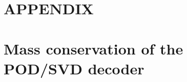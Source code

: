 \documentclass{article}
\begin{document}



\section*{APPENDIX}
\appendix
\renewcommand{\theequation}{A.\arabic{equation}}
\renewcommand{\thefigure}{A.\arabic{figure}}
\renewcommand{\thetable}{A.\arabic{table}}
\renewcommand{\theprop}{A.\arabic{prop}}
\setcounter{equation}{0}
\setcounter{figure}{0}
\setcounter{table}{0}
\setcounter{prop}{0}

\section{Mass conservation of the POD/SVD decoder}
\label{app:POD}
\end{document}

